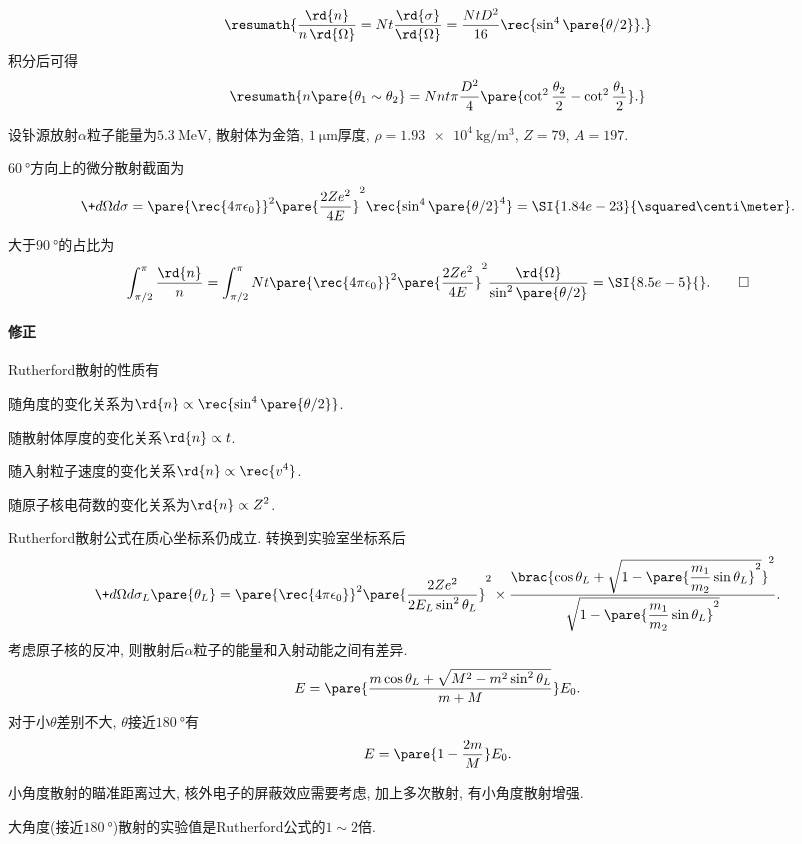 \documentclass[hidelinks]{ctexart}
\begin{document}
\[ \resumath{\frac{\rd{n}}{n\,\rd{\Omega}} = Nt \frac{\rd{\sigma}}{\rd{\Omega}} = \frac{NtD^2}{16}\rec{\sin^4\pare{\theta/2}}.} \]
积分后可得
\[ \resumath{n\pare{\theta_1\sim \theta_2} = Nnt\pi \frac{D^2}{4}\pare{\cot^2 \frac{\theta_2}{2} - \cot^2 \frac{\theta_1}{2}}.} \]
\begin{sample}
    \begin{ex}
        设钋源放射$\alpha$粒子能量为$\SI{5.3}{\mega\eV}$, 散射体为金箔, $\SI{1}{\micro\meter}$厚度, $\rho = \SI{1.93e4}{\kilo\gram\per\cubic\meter}$, $Z=79$, $A=197$.
    \end{ex}
    \begin{solution}
        $\SI{60}{\degree}$方向上的微分散射截面为
        \[ \+d{\Omega}d{\sigma} = \pare{\rec{4\pi\epsilon_0}}^2 \pare{\frac{2Ze^2}{4E}}^2 \rec{\sin^4\pare{\theta/2}^4} = \SI{1.84e-23}{\squared\centi\meter}. \]
        \par
        大于$\SI{90}{\degree}$的占比为
        \[ \int_{\pi/2}^{\pi} \frac{\rd{n}}{n} = \int_{\pi/2}^{\pi} Nt\pare{\rec{4\pi\epsilon_0}}^2\pare{\frac{2Ze^2}{4E}}^2 \frac{\rd{\Omega}}{\sin^2\pare{\theta/2}} = \SI{8.5e-5}{}. \qedhere \]
    \end{solution}
\end{sample}

\paragraph{修正} %
\label{par:修正}

Rutherford散射的性质有
\begin{cenum}
    \item 随角度的变化关系为$\displaystyle \rd{n}\propto \rec{\sin^4\pare{\theta/2}}$.
    \item 随散射体厚度的变化关系$\displaystyle \rd{n}\propto t$.
    \item 随入射粒子速度的变化关系$\displaystyle \rd{n}\propto \rec{v^4}$.
    \item 随原子核电荷数的变化关系为$\displaystyle \rd{n}\propto Z^2$.
\end{cenum}
Rutherford散射公式在质心坐标系仍成立. 转换到实验室坐标系后
\[ \+d{\Omega}d{\sigma_L\pare{\theta_L}} = \pare{\rec{4\pi\epsilon_0}}^2 \pare{\frac{2Ze^2}{\displaystyle 2E_L \sin^2 {\theta_L}}}^2\times \frac{\displaystyle \brac{\cos\theta_L + \sqrt{1-\pare{\frac{m_1}{m_2}\sin\theta_L}^2}}^2}{\displaystyle \sqrt{1-\pare{\frac{m_1}{m_2}\sin\theta_L}^2}}. \]
考虑原子核的反冲, 则散射后$\alpha$粒子的能量和入射动能之间有差异.
\[ E = \pare{\frac{m\cos\theta_L + \sqrt{M^2 - m^2\sin^2\theta_L}}{m+M}}E_0. \]
对于小$\theta$差别不大, $\theta$接近$\SI{180}{\degree}$有
\[ E = \pare{1-\frac{2m}{M}}E_0. \]
\begin{remark}
    小角度散射的瞄准距离过大, 核外电子的屏蔽效应需要考虑, 加上多次散射, 有小角度散射增强.
\end{remark}
\begin{remark}
    大角度(接近$\SI{180}{\degree}$)散射的实验值是Rutherford公式的$1\sim 2$倍.
\end{remark}
\end{document}
